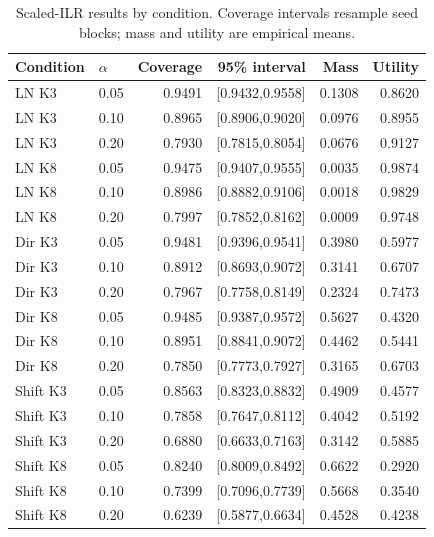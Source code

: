 \begin{table}[p]
\centering\small
\caption{Scaled-ILR results by condition. Coverage intervals resample seed blocks; mass and utility are empirical means.}
\begin{tabular}{llrrrr}
\toprule
Condition & $\alpha$ & Coverage & 95\% interval & Mass & Utility \\
\midrule
LN K3 & 0.05 & 0.9491 & [0.9432,0.9558] & 0.1308 & 0.8620 \\
LN K3 & 0.10 & 0.8965 & [0.8906,0.9020] & 0.0976 & 0.8955 \\
LN K3 & 0.20 & 0.7930 & [0.7815,0.8054] & 0.0676 & 0.9127 \\
LN K8 & 0.05 & 0.9475 & [0.9407,0.9555] & 0.0035 & 0.9874 \\
LN K8 & 0.10 & 0.8986 & [0.8882,0.9106] & 0.0018 & 0.9829 \\
LN K8 & 0.20 & 0.7997 & [0.7852,0.8162] & 0.0009 & 0.9748 \\
Dir K3 & 0.05 & 0.9481 & [0.9396,0.9541] & 0.3980 & 0.5977 \\
Dir K3 & 0.10 & 0.8912 & [0.8693,0.9072] & 0.3141 & 0.6707 \\
Dir K3 & 0.20 & 0.7967 & [0.7758,0.8149] & 0.2324 & 0.7473 \\
Dir K8 & 0.05 & 0.9485 & [0.9387,0.9572] & 0.5627 & 0.4320 \\
Dir K8 & 0.10 & 0.8951 & [0.8841,0.9072] & 0.4462 & 0.5441 \\
Dir K8 & 0.20 & 0.7850 & [0.7773,0.7927] & 0.3165 & 0.6703 \\
Shift K3 & 0.05 & 0.8563 & [0.8323,0.8832] & 0.4909 & 0.4577 \\
Shift K3 & 0.10 & 0.7858 & [0.7647,0.8112] & 0.4042 & 0.5192 \\
Shift K3 & 0.20 & 0.6880 & [0.6633,0.7163] & 0.3142 & 0.5885 \\
Shift K8 & 0.05 & 0.8240 & [0.8009,0.8492] & 0.6622 & 0.2920 \\
Shift K8 & 0.10 & 0.7399 & [0.7096,0.7739] & 0.5668 & 0.3540 \\
Shift K8 & 0.20 & 0.6239 & [0.5877,0.6634] & 0.4528 & 0.4238 \\
\bottomrule
\end{tabular}
\end{table}
